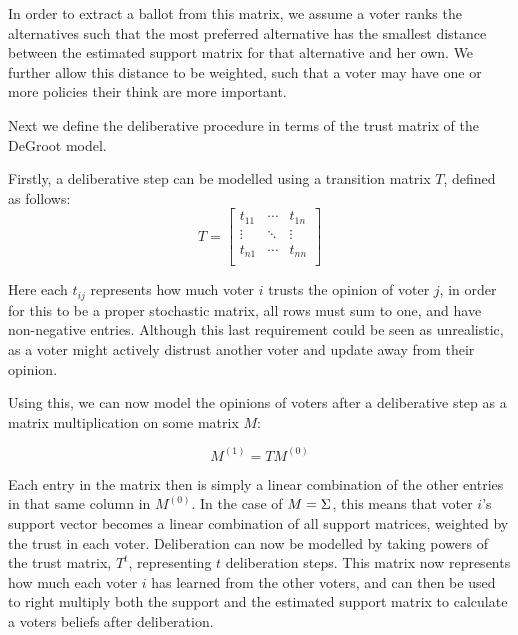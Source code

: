 In order to extract a ballot from this matrix, we assume a voter ranks the
alternatives such that the most preferred alternative has the smallest distance
between the estimated support matrix for that alternative and her own. We
further allow this distance to be weighted, such that a voter may have one or
more policies their think are more important.


Next we define the deliberative procedure in terms of the trust matrix of the
DeGroot model.

Firstly, a deliberative step can be modelled using a transition matrix $T$,
defined as follows: \[ T=\begin{bmatrix} t_{11} & \cdots & t_{1n} \\ \vdots &
                \ddots & \vdots          \\ t_{n1} & \cdots  & t_{nn} \\\end{bmatrix} \]

Here each $t_{ij}$ represents how much voter $i$ trusts the opinion of voter
$j$, in order for this to be a proper stochastic matrix, all rows must sum to
one, and have non-negative entries. Although this last requirement could be
seen as unrealistic, as a voter might actively distrust another voter and
update away from their opinion.

Using this, we can now model the opinions of voters after a deliberative step
as a matrix multiplication on some matrix $M$:

\begin{equation} M^{(1)} = TM^{(0)} \label{eq:update_degroot} \end{equation}

Each entry in the matrix then is simply a linear combination of the other
entries in that same column in $M^{(0)}$. In the case of $M = \Sigma$,
this means that voter $i$'s support vector becomes a linear combination of all
support matrices, weighted by the trust in each voter. Deliberation can now be
modelled by taking powers of the trust matrix, $T^{t}$, representing $t$
deliberation steps. This matrix now represents how much each voter $i$ has
learned from the other voters, and can then be used to right multiply both the
support and the estimated support matrix to calculate a voters beliefs after
deliberation.

